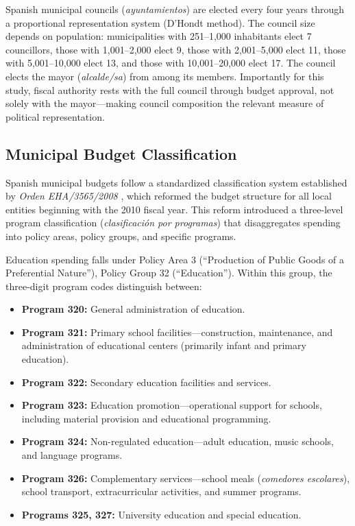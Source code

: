 \documentclass[12pt]{article}
\begin{document}
Spanish municipal councils (\emph{ayuntamientos}) are elected every four years through a proportional representation system (D'Hondt method). The council size depends on population: municipalities with 251--1,000 inhabitants elect 7 councillors, those with 1,001--2,000 elect 9, those with 2,001--5,000 elect 11, those with 5,001--10,000 elect 13, and those with 10,001--20,000 elect 17. The council elects the mayor (\emph{alcalde/sa}) from among its members. Importantly for this study, fiscal authority rests with the full council through budget approval, not solely with the mayor---making council composition the relevant measure of political representation.

\subsection{Municipal Budget Classification}

Spanish municipal budgets follow a standardized classification system established by \emph{Orden EHA/3565/2008} \citep{orden2008}, which reformed the budget structure for all local entities beginning with the 2010 fiscal year. This reform introduced a three-level program classification (\emph{clasificaci\'{o}n por programas}) that disaggregates spending into policy areas, policy groups, and specific programs.

Education spending falls under Policy Area 3 (``Production of Public Goods of a Preferential Nature''), Policy Group 32 (``Education''). Within this group, the three-digit program codes distinguish between:

\begin{itemize}
    \item \textbf{Program 320:} General administration of education.
    \item \textbf{Program 321:} Primary school facilities---construction, maintenance, and administration of educational centers (primarily infant and primary education).
    \item \textbf{Program 322:} Secondary education facilities and services.
    \item \textbf{Program 323:} Education promotion---operational support for schools, including material provision and educational programming.
    \item \textbf{Program 324:} Non-regulated education---adult education, music schools, and language programs.
    \item \textbf{Program 326:} Complementary services---school meals (\emph{comedores escolares}), school transport, extracurricular activities, and summer programs.
    \item \textbf{Programs 325, 327:} University education and special education.
\end{itemize}
\end{document}
